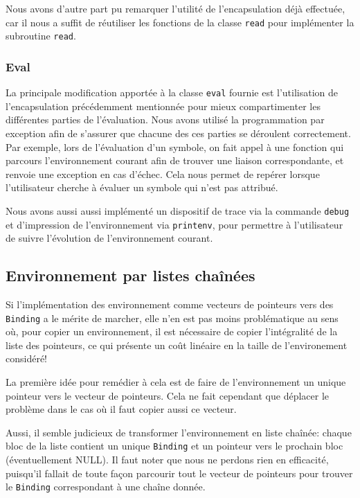 \documentclass[a4paper,11pt]{article}
\begin{document}
  Nous avons d'autre part pu remarquer l'utilité de l'encapsulation déjà effectuée, 
  car il nous a suffit de réutiliser les fonctions de la classe \texttt{read} 
  pour implémenter la subroutine \texttt{read}.
  
 \subsubsection{Eval}
 
 La principale modification apportée à la classe \texttt{eval} fournie est 
l'utilisation de l'encapsulation précédemment mentionnée pour mieux compartimenter 
les différentes parties de l'évaluation. Nous avons utilisé la programmation 
par exception afin de s'assurer que chacune des ces parties se déroulent 
correctement. Par exemple, lors de l'évaluation d'un symbole, on fait appel 
à une fonction qui parcours l'environnement courant afin de trouver une liaison 
correspondante, et renvoie une exception en cas d'échec. Cela nous permet de 
repérer lorsque l'utilisateur cherche à évaluer un symbole qui n'est pas attribué.

Nous avons aussi aussi implémenté un dispositif de trace via la commande 
\texttt{debug} et d'impression de l'environnement via \texttt{printenv}, 
pour permettre à l'utilisateur de suivre l'évolution de l'environnement courant.

\subsection{Environnement par listes chaînées}

Si l'implémentation des environnement comme vecteurs 
de pointeurs vers des \texttt{Binding} a le mérite de marcher, elle n'en est
pas moins problématique au sens où, pour copier un environnement, il est
nécessaire de copier l'intégralité de la liste des pointeurs, ce qui présente un
coût linéaire en la taille de l'environement considéré!

La première idée pour remédier à cela est de faire de l'environnement un unique
pointeur vers le vecteur de pointeurs. Cela ne fait cependant que déplacer le
problème dans le cas où il faut copier aussi ce vecteur.

Aussi, il semble judicieux de transformer l’environnement en liste chaînée:
chaque bloc de la liste contient un unique \texttt{Binding} et un pointeur vers
le prochain bloc (éventuellement NULL). Il faut noter que nous ne perdons rien
en efficacité, puisqu'il fallait de toute façon parcourir tout le vecteur de
pointeurs pour trouver le \texttt{Binding} correspondant à une chaîne donnée.
\end{document}
